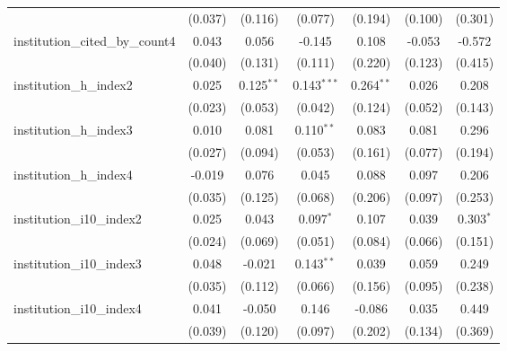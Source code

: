 \begin{tabular}{lcccccc}
                                         & (0.037)        & (0.116)       & (0.077)        & (0.194)       & (0.100)        & (0.301)\\   
   institution\_cited\_by\_count4        & 0.043          & 0.056         & -0.145         & 0.108         & -0.053         & -0.572\\   
                                         & (0.040)        & (0.131)       & (0.111)        & (0.220)       & (0.123)        & (0.415)\\   
   institution\_h\_index2                & 0.025          & 0.125$^{**}$  & 0.143$^{***}$  & 0.264$^{**}$  & 0.026          & 0.208\\   
                                         & (0.023)        & (0.053)       & (0.042)        & (0.124)       & (0.052)        & (0.143)\\   
   institution\_h\_index3                & 0.010          & 0.081         & 0.110$^{**}$   & 0.083         & 0.081          & 0.296\\   
                                         & (0.027)        & (0.094)       & (0.053)        & (0.161)       & (0.077)        & (0.194)\\   
   institution\_h\_index4                & -0.019         & 0.076         & 0.045          & 0.088         & 0.097          & 0.206\\   
                                         & (0.035)        & (0.125)       & (0.068)        & (0.206)       & (0.097)        & (0.253)\\   
   institution\_i10\_index2              & 0.025          & 0.043         & 0.097$^{*}$    & 0.107         & 0.039          & 0.303$^{*}$\\   
                                         & (0.024)        & (0.069)       & (0.051)        & (0.084)       & (0.066)        & (0.151)\\   
   institution\_i10\_index3              & 0.048          & -0.021        & 0.143$^{**}$   & 0.039         & 0.059          & 0.249\\   
                                         & (0.035)        & (0.112)       & (0.066)        & (0.156)       & (0.095)        & (0.238)\\   
   institution\_i10\_index4              & 0.041          & -0.050        & 0.146          & -0.086        & 0.035          & 0.449\\   
                                         & (0.039)        & (0.120)       & (0.097)        & (0.202)       & (0.134)        & (0.369)\\   

\end{tabular}
